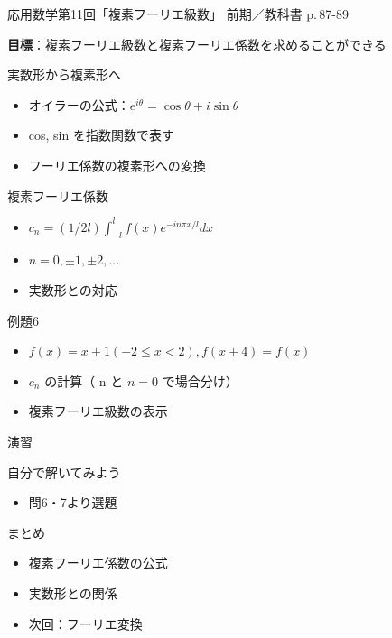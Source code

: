\documentclass[aspectratio=43,professionalfonts,handout]{beamer}
\newcommand{\LectureNum}{11}
\newcommand{\LectureTitle}{複素フーリエ級数}
\newcommand{\TextPages}{p.\,87-89}
\newcommand{\CourseName}{応用数学}
\renewcommand{\TermName}{前期}
\begin{document}
\begin{frame}{\CourseName\quad 第\LectureNum 回「\LectureTitle」}
  {\small \TermName\quad \TeacherName\quad ／\quad 教科書 \TextPages}

  \textbf{目標}：複素フーリエ級数と複素フーリエ係数を求めることができる

\end{frame}

\begin{frame}{実数形から複素形へ}
  \begin{block}{}
  \begin{itemize}
    \item オイラーの公式：$e^{i\theta} = \cos \theta + i \sin \theta$
    \item cos, sin を指数関数で表す
    \item フーリエ係数の複素形への変換
  \end{itemize}
  \end{block}
\end{frame}

\begin{frame}{複素フーリエ係数}
  \begin{block}{}
  \begin{itemize}
    \item $c_{n} = (1/2l)\int_{-l}^{l} f(x)e^{-in\pi x/l} dx$
    \item $n = 0, ±1, ±2, ...$
    \item 実数形との対応
  \end{itemize}
  \end{block}
\end{frame}

\begin{frame}{例題6}
  \begin{block}{}
  \begin{itemize}
    \item $f(x)=x+1(-2\leq x<2), f(x+4)=f(x)$
    \item $c_{n}$ の計算（ n と $n=0$ で場合分け）
    \item 複素フーリエ級数の表示
  \end{itemize}
  \end{block}
\end{frame}

\begin{frame}{演習}
  \begin{exampleblock}{自分で解いてみよう}
  \begin{itemize}
    \item 問6・7より選題
  \end{itemize}
  \end{exampleblock}
\end{frame}

\begin{frame}{まとめ}
  \begin{itemize}
    \item 複素フーリエ係数の公式
    \item 実数形との関係
    \item 次回：フーリエ変換
  \end{itemize}
\end{frame}
\end{document}
